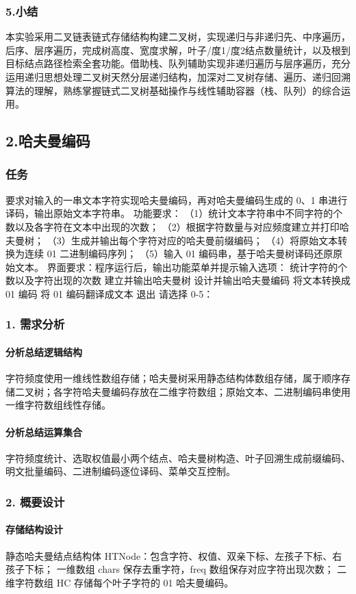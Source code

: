 \documentclass{ctexart}
\begin{document}
\subsubsection{5.小结}
本实验采用二叉链表链式存储结构构建二叉树，实现递归与非递归先、中序遍历，后序、层序遍历，完成树高度、宽度求解，叶子/度1/度2结点数量统计，以及根到目标结点路径检索全套功能。借助栈、队列辅助实现非递归遍历与层序遍历，充分运用递归思想处理二叉树天然分层递归结构，加深对二叉树存储、遍历、递归回溯算法的理解，熟练掌握链式二叉树基础操作与线性辅助容器（栈、队列）的综合运用。


\subsection {2.哈夫曼编码}
\subsubsection {任务}
要求对输入的一串文本字符实现哈夫曼编码，再对哈夫曼编码生成的 0、1 串进行译码，输出原始文本字符串。
功能要求：
（1）统计文本字符串中不同字符的个数以及各字符在文本中出现的次数；
（2）根据字符数量与对应频度建立并打印哈夫曼树；
（3）生成并输出每个字符对应的哈夫曼前缀编码；
（4）将原始文本转换为连续 01 二进制编码序列；
（5）输入 01 编码串，基于哈夫曼树译码还原原始文本。
界面要求：程序运行后，输出功能菜单并提示输入选项：
统计字符的个数以及字符出现的次数
建立并输出哈夫曼树
设计并输出哈夫曼编码
将文本转换成 01 编码
将 01 编码翻译成文本
退出
请选择 0-5：
\subsubsection{1. 需求分析}
\paragraph{分析总结逻辑结构}
字符频度使用一维线性数组存储；哈夫曼树采用静态结构体数组存储，属于顺序存储二叉树；各字符哈夫曼编码存放在二维字符数组；原始文本、二进制编码串使用一维字符数组线性存储。
\paragraph{分析总结运算集合}
字符频度统计、选取权值最小两个结点、哈夫曼树构造、叶子回溯生成前缀编码、明文批量编码、二进制编码逐位译码、菜单交互控制。
\subsubsection{2. 概要设计}
\paragraph{存储结构设计}
静态哈夫曼结点结构体 HTNode：包含字符、权值、双亲下标、左孩子下标、右孩子下标；
一维数组 chars 保存去重字符，freq 数组保存对应字符出现次数；
二维字符数组 HC 存储每个叶子字符的 01 哈夫曼编码。
\end{document}
